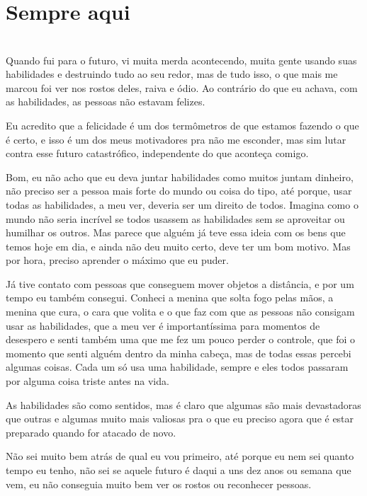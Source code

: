 
\newpage


\ifdefined\useChapters
\chapter{Sempre aqui}
\else
\chapter{}
\fi
Quando fui para o futuro, vi muita merda acontecendo, muita gente usando suas habilidades e destruindo tudo ao seu redor, mas de tudo isso, o que mais me marcou foi ver nos rostos deles, raiva e ódio. Ao contrário do que eu achava, com as habilidades, as pessoas não estavam felizes.

Eu acredito que a felicidade é um dos termômetros de que estamos fazendo o que é certo, e isso é um dos meus motivadores pra não me esconder, mas sim lutar contra esse futuro catastrófico, independente do que aconteça comigo.

Bom, eu não acho que eu deva juntar habilidades como muitos juntam dinheiro, não preciso ser a pessoa mais forte do mundo ou coisa do tipo, até porque, usar todas as habilidades, a meu ver, deveria ser um direito de todos. Imagina como o mundo não seria incrível se todos usassem as habilidades sem se aproveitar ou humilhar os outros. Mas parece que alguém já teve essa ideia com os bens que temos hoje em dia, e ainda não deu muito certo, deve ter um bom motivo. Mas por hora, preciso aprender o máximo que eu puder.

Já tive contato com pessoas que conseguem mover objetos a distância, e por um tempo eu também consegui. Conheci a menina que solta fogo pelas mãos, a menina que cura, o cara que volita e o que faz com que as pessoas não consigam usar as habilidades, que a meu ver é importantíssima para momentos de desespero e senti também uma que me fez um pouco perder o controle, que foi o momento que senti alguém dentro da minha cabeça, mas de todas essas percebi algumas coisas. Cada um só usa uma habilidade, sempre e eles todos passaram por alguma coisa triste antes na vida.

As habilidades são como sentidos, mas é claro que algumas são mais devastadoras que outras e algumas muito mais valiosas pra o que eu preciso agora que é estar preparado quando for atacado de novo.

Não sei muito bem atrás de qual eu vou primeiro, até porque eu nem sei quanto tempo eu tenho, não sei se aquele futuro é daqui a uns dez anos ou semana que vem, eu não conseguia muito bem ver os rostos ou reconhecer pessoas.

